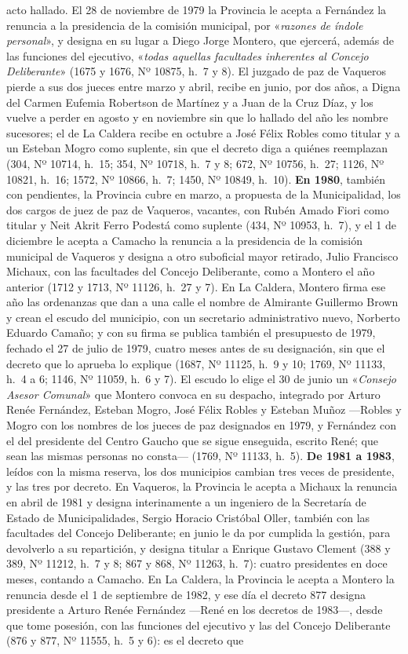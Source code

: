 acto hallado. El 28 de noviembre de 1979 la Provincia le acepta a Fernández la renuncia a la presidencia de la comisión municipal, por «\textit{razones de índole personal}», y designa en su lugar a Diego Jorge Montero, que ejercerá, además de las funciones del ejecutivo, «\textit{todas aquellas facultades inherentes al Concejo Deliberante}» (1675 y 1676, Nº 10875, h.\ 7 y 8). El juzgado de paz de Vaqueros pierde a sus dos jueces entre marzo y abril, recibe en junio, por dos años, a Digna del Carmen Eufemia Robertson de Martínez y a Juan de la Cruz Díaz, y los vuelve a perder en agosto y en noviembre sin que lo hallado del año les nombre sucesores; el de La Caldera recibe en octubre a José Félix Robles como titular y a un Esteban Mogro como suplente, sin que el decreto diga a quiénes reemplazan (304, Nº 10714, h.\ 15; 354, Nº 10718, h.\ 7 y 8; 672, Nº 10756, h.\ 27; 1126, Nº 10821, h.\ 16; 1572, Nº 10866, h.\ 7; 1450, Nº 10849, h.\ 10). \textbf{En 1980}, también con pendientes, la Provincia cubre en marzo, a propuesta de la Municipalidad, los dos cargos de juez de paz de Vaqueros, vacantes, con Rubén Amado Fiori como titular y Neit Akrit Ferro Podestá como suplente (434, Nº 10953, h.\ 7), y el 1 de diciembre le acepta a Camacho la renuncia a la presidencia de la comisión municipal de Vaqueros y designa a otro suboficial mayor retirado, Julio Francisco Michaux, con las facultades del Concejo Deliberante, como a Montero el año anterior (1712 y 1713, Nº 11126, h.\ 27 y 7). En La Caldera, Montero firma ese año las ordenanzas que dan a una calle el nombre de Almirante Guillermo Brown y crean el escudo del municipio, con un secretario administrativo nuevo, Norberto Eduardo Camaño; y con su firma se publica también el presupuesto de 1979, fechado el 27 de julio de 1979, cuatro meses antes de su designación, sin que el decreto que lo aprueba lo explique (1687, Nº 11125, h.\ 9 y 10; 1769, Nº 11133, h.\ 4 a 6; 1146, Nº 11059, h.\ 6 y 7). El escudo lo elige el 30 de junio un «\textit{Consejo Asesor Comunal}» que Montero convoca en su despacho, integrado por Arturo Renée Fernández, Esteban Mogro, José Félix Robles y Esteban Muñoz ---Robles y Mogro con los nombres de los jueces de paz designados en 1979, y Fernández con el del presidente del Centro Gaucho que se sigue enseguida, escrito René; que sean las mismas personas no consta--- (1769, Nº 11133, h.\ 5). \textbf{De 1981 a 1983}, leídos con la misma reserva, los dos municipios cambian tres veces de presidente, y las tres por decreto. En Vaqueros, la Provincia le acepta a Michaux la renuncia en abril de 1981 y designa interinamente a un ingeniero de la Secretaría de Estado de Municipalidades, Sergio Horacio Cristóbal Oller, también con las facultades del Concejo Deliberante; en junio le da por cumplida la gestión, para devolverlo a su repartición, y designa titular a Enrique Gustavo Clement (388 y 389, Nº 11212, h.\ 7 y 8; 867 y 868, Nº 11263, h.\ 7): cuatro presidentes en doce meses, contando a Camacho. En La Caldera, la Provincia le acepta a Montero la renuncia desde el 1 de septiembre de 1982, y ese día el decreto 877 designa presidente a Arturo Renée Fernández ---René en los decretos de 1983---, desde que tome posesión, con las funciones del ejecutivo y las del Concejo Deliberante (876 y 877, Nº 11555, h.\ 5 y 6): es el decreto que 